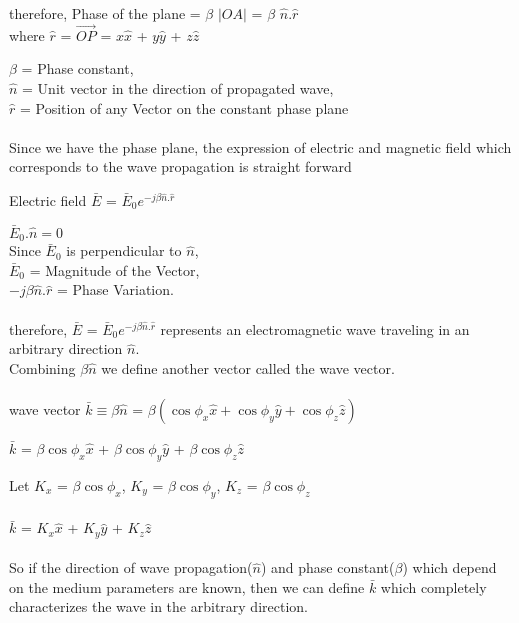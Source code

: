 \begin{center}
therefore, Phase of the plane = $\beta$ $\left|OA \right|$ = $\beta$ $\hat{n}.\hat{r}$
\\
where $\hat{r}$ = $\vec{OP}$ = $x\hat{x}$ + $y\hat{y}$ + $z\hat{z}$

\end{center}
$\beta$ = Phase constant,\\
$\hat{n}$ = Unit vector in the direction of propagated wave,\\
$\hat{r}$ = Position of any Vector on the constant phase plane
\\
\\
Since we have the phase plane, the expression of electric and magnetic field which corresponds to the wave propagation is straight forward
\begin{center}

Electric field $\bar{E}$ = $\bar{E}_{0}e^{-j\beta \hat{n}.\hat{r}}$

\end{center}
 $\bar{E}_{0}.\hat{n} = 0$
\\
Since $\bar{E}_{0}$ is perpendicular to $\hat{n}$,\\
$\bar{E}_{0}$ = Magnitude of the Vector,\\
$-j\beta \hat{n}.\hat{r}$ = Phase Variation.
\\
\\
therefore, $\bar{E}$ = $\bar{E}_{0}e^{-j\beta \hat{n}.\hat{r}}$ represents an electromagnetic wave traveling in an arbitrary direction $\hat{n}$.\\
Combining $\beta\hat{n}$ we define another vector called the wave vector.
\\
\\
wave vector $\bar{k} \equiv \beta \hat{n}$ = $\beta(\cos\phi_{x}\hat{x} + \cos\phi_{y}\hat{y} + \cos\phi_{z}\hat{z})$
\begin{center}
	$\bar{k}$ = $\beta\cos\phi_{x}\hat{x}$ + $\beta\cos\phi_{y}\hat{y}$ + $\beta\cos\phi_{z}\hat{z}$
\end{center}
Let $K_{x}$ = $\beta\cos\phi_{x}$, $K_{y}$ = $\beta\cos\phi_{y}$, 
$K_{z}$ = $\beta\cos\phi_{z}$
\\
\\
$\bar{k}$ = $K_{x}\hat{x}$ + $K_{y}\hat{y}$ + $K_{z}\hat{z}$
\\
\\
So if the direction of wave propagation($\hat{n}$) and phase constant($\beta$) which depend on the medium parameters are known, then we can define $\bar{k}$ which completely characterizes the wave in the arbitrary direction.

